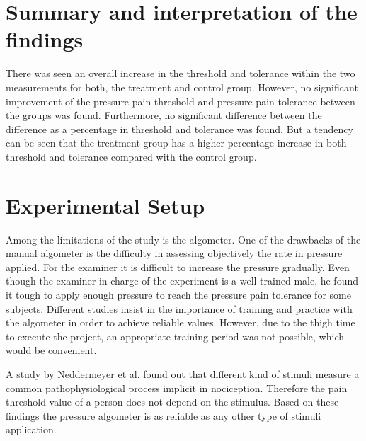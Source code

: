 \section{Summary and interpretation of the findings}
There was seen an overall increase in the threshold and tolerance within the two measurements for both, the treatment and control group. However, no significant improvement of the pressure pain threshold and pressure pain tolerance between the groups was found. Furthermore, no significant difference between the difference as a percentage in threshold and tolerance was found. But a tendency can be seen that the treatment group has a higher percentage increase in both threshold and tolerance compared with the control group. 


\section{Experimental Setup}
Among the limitations of the study is the algometer. One of the drawbacks of the manual algometer is the difficulty in assessing objectively the rate in pressure applied. For the examiner it is difficult to increase the pressure gradually. Even though the examiner in charge of the experiment is a well-trained male, he found it tough to apply enough pressure to reach the pressure pain tolerance for some subjects. Different studies insist in the importance of training and practice with the algometer in order to achieve reliable values. However, due to the thigh time to execute the project, an appropriate training period was not possible, which would be convenient.


A study by Neddermeyer et al. \cite{Neddermeyer2007} found out that different kind of stimuli  measure a common pathophysiological process implicit in nociception. Therefore the pain threshold value of a person does not depend on the stimulus. Based on these findings the pressure algometer is as reliable as any other type of stimuli application.

